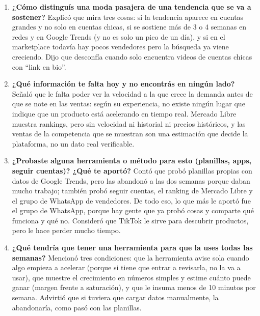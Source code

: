 \begin{enumerate}
	\item \textbf{¿Cómo distinguís una moda pasajera de una tendencia que se va a sostener?} Explicó que mira tres cosas: si la tendencia aparece en cuentas grandes y no solo en cuentas chicas, si se sostiene más de 3 o 4 semanas en redes y en Google Trends (y no es solo un pico de un día), y si en el marketplace todavía hay pocos vendedores pero la búsqueda ya viene creciendo. Dijo que desconfía cuando solo encuentra videos de cuentas chicas con ``link en bio''.
	\item \textbf{¿Qué información te falta hoy y no encontrás en ningún lado?} Señaló que le falta poder ver la velocidad a la que crece la demanda antes de que se note en las ventas: según su experiencia, no existe ningún lugar que indique que un producto está acelerando en tiempo real. Mercado Libre muestra rankings, pero sin velocidad ni historial ni precios históricos, y las ventas de la competencia que se muestran son una estimación que decide la plataforma, no un dato real verificable.
	\item \textbf{¿Probaste alguna herramienta o método para esto (planillas, apps, seguir cuentas)? ¿Qué te aportó?} Contó que probó planillas propias con datos de Google Trends, pero las abandonó a las dos semanas porque daban mucho trabajo; también probó seguir cuentas, el ranking de Mercado Libre y el grupo de WhatsApp de vendedores. De todo eso, lo que más le aportó fue el grupo de WhatsApp, porque hay gente que ya probó cosas y comparte qué funciona y qué no. Consideró que TikTok le sirve para descubrir productos, pero le hace perder mucho tiempo.
	\item \textbf{¿Qué tendría que tener una herramienta para que la uses todas las semanas?} Mencionó tres condiciones: que la herramienta avise sola cuando algo empieza a acelerar (porque si tiene que entrar a revisarla, no la va a usar), que muestre el crecimiento en números simples y estime cuánto puede ganar (margen frente a saturación), y que le insuma menos de 10 minutos por semana. Advirtió que si tuviera que cargar datos manualmente, la abandonaría, como pasó con las planillas.
\end{enumerate}
